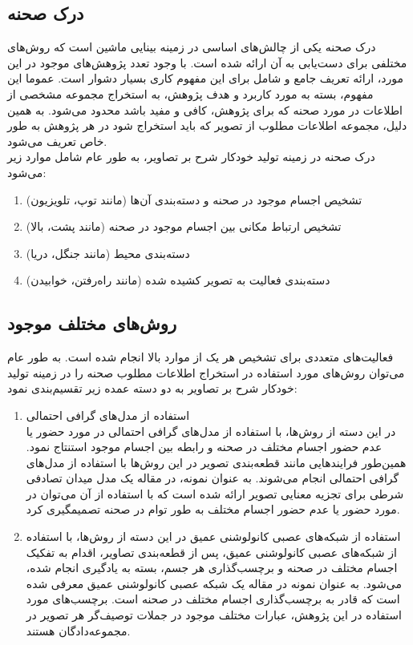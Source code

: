 \subsection{درک صحنه}
درک صحنه یکی از چالش‌های اساسی در زمینه بینایی ماشین است که روش‌های مختلفی برای دست‌یابی به آن ارائه شده است. با وجود تعدد پژوهش‌های موجود در این مورد، ارائه تعریف جامع و شامل برای این مفهوم کاری بسیار دشوار است. عموما این مفهوم، بسته به مورد کاربرد و هدف پژوهش، به استخراج مجموعه مشخصی از اطلاعات در مورد صحنه که برای پژوهش، کافی و مفید باشد محدود می‌شود. به همین دلیل، مجموعه اطلاعات مطلوب از تصویر که باید استخراج شود در هر پژوهش به طور خاص تعریف می‌شود.
\\
درک صحنه در زمینه تولید خودکار شرح بر تصاویر، به طور عام شامل موارد زیر می‌شود:
\begin{enumerate}
\item تشخیص اجسام موجود در صحنه و دسته‌بندی آن‌ها (مانند توپ، تلویزیون)
\item تشخیص ارتباط مکانی بین اجسام موجود در صحنه (مانند پشت، بالا)
\item دسته‌بندی محیط (مانند جنگل، دریا)
\item دسته‌بندی فعالیت به تصویر کشیده شده (مانند راه‌رفتن، خوابیدن)
\end{enumerate}

\subsection{روش‌های مختلف موجود}
فعالیت‌های متعددی برای تشخیص هر یک از موارد بالا انجام شده است. به طور عام می‌توان روش‌های مورد استفاده در استخراج اطلاعات مطلوب صحنه را در زمینه تولید خودکار شرح بر تصاویر به دو دسته عمده زیر تقسیم‌بندی نمود:

\begin{enumerate}
\item استفاده از مدل‌های گرافی احتمالی \\

در این دسته از روش‌ها، با استفاده از مدل‌های گرافی احتمالی در مورد حضور یا عدم حضور اجسام مختلف در صحنه و رابطه بین اجسام موجود استنتاج نمود. همین‌طور فرایند‌هایی مانند قطعه‌بندی تصویر
در این روش‌ها با استفاده از مدل‌های گرافی احتمالی انجام می‌شوند. به عنوان نمونه، در مقاله
\cite{fidler2013sentence}
 یک مدل میدان تصادفی شرطی
  برای تجزیه معنایی تصویر ارائه شده است که با استفاده از آن می­‌توان در مورد حضور یا عدم حضور اجسام مختلف به طور توام در صحنه تصمیم­گیری کرد.
\item استفاده از شبکه‌های عصبی کانولوشنی عمیق
در این دسته از روش‌ها، با استفاده از شبکه‌های عصبی کانولوشنی عمیق، پس از قطعه‌بندی تصاویر، اقدام به تفکیک اجسام مختلف در صحنه و برچسب‌گذاری هر جسم، بسته به یادگیری انجام شده، می‌شود. به عنوان نمونه در مقاله
\cite{karpathy2015deep}
 یک شبکه عصبی کانولوشنی عمیق معرفی شده است که قادر به برچسب‌گذاری اجسام مختلف در صحنه است. برچسب‌های مورد استفاده در این پژوهش، عبارات مختلف موجود در جملات توصیف‌گر هر تصویر در مجموعه‌دادگان هستند.

\end{enumerate}

